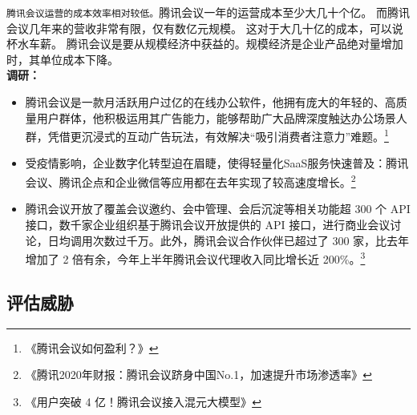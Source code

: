 \documentclass[a4paper,12pt]{article}
\begin{document}
\texttt{腾讯会议运营的成本效率相对较低。}腾讯会议一年的运营成本至少大几十个亿。 而腾讯会议几年来的营收非常有限，仅有数亿元规模。 这对于大几十亿的成本，可以说杯水车薪。
腾讯会议是要从规模经济中获益的。规模经济是企业产品绝对量增加时，其单位成本下降。\\
\textbf{调研：}
\begin{itemize}
    \item 腾讯会议是一款月活跃用户过亿的在线办公软件，他拥有庞大的年轻的、高质量用户群体，他积极运用其广告能力，能够帮助广大品牌深度触达办公场景人群，凭借更沉浸式的互动广告玩法，有效解决“吸引消费者注意力”难题。\footnote{《腾讯会议如何盈利？》}
    \item 受疫情影响，企业数字化转型迫在眉睫，使得轻量化SaaS服务快速普及：腾讯会议、腾讯企点和企业微信等应用都在去年实现了较高速度增长。\footnote{《腾讯2020年财报：腾讯会议跻身中国No.1，加速提升市场渗透率》}
    \item 腾讯会议开放了覆盖会议邀约、会中管理、会后沉淀等相关功能超 300 个 API 接口，数千家企业组织基于腾讯会议开放提供的 API 接口，进行商业会议讨论，日均调用次数过千万。此外，腾讯会议合作伙伴已超过了 300 家，比去年增加了 2 倍有余，今年上半年腾讯会议代理收入同比增长近 200\%。\footnote{《用户突破 4 亿！腾讯会议接入混元大模型》}
\end{itemize}



    \subsection{评估威胁}\label{subsec:threat}
\end{document}
